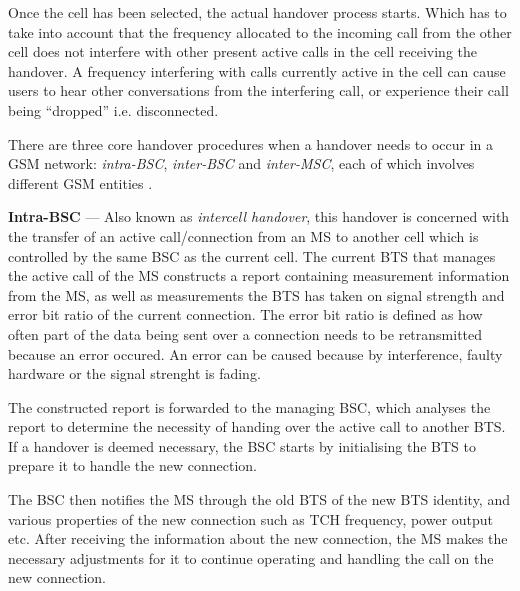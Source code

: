 Once the cell has been selected, the actual handover process starts. Which has to take into account that the frequency allocated to the incoming call from the other cell does not interfere with other present active calls in the cell receiving the handover\cite{Eisenblatter,GSMArchitectureProtocolsServices,wirelesstelcoMullet}. A frequency interfering with calls currently active in the cell can cause users to hear other conversations from the interfering call, or experience their call being ``dropped'' i.e. disconnected\cite{Eisenblatter}. 

There are three core handover procedures when a handover needs to occur in a GSM network: \emph{intra-BSC}, \emph{inter-BSC} and \emph{inter-MSC}, each of which involves different GSM entities \cite{wirelesstelcoMullet}.

\begin{description}
\item{\textbf{Intra-BSC}} --- Also known as \emph{intercell handover}, this handover is concerned with the transfer of an active call/connection from an MS to another cell which is controlled by the same BSC as the current cell\cite{wirelesstelcoMullet,GSMArchitectureProtocolsServices}. The current BTS that manages the active call of the MS constructs a report containing measurement information from the MS, as well as measurements the BTS has taken on signal strength and error bit ratio of the current connection\cite{wirelesstelcoMullet,GSMArchitectureProtocolsServices}. The error bit ratio is defined as how often part of the data being sent over a connection needs to be retransmitted because an error occured\cite{wirelesstelcoMullet,GSMArchitectureProtocolsServices}. An error can be caused because by interference, faulty hardware or the signal strenght is fading\cite{wirelesstelcoMullet,GSMArchitectureProtocolsServices}. 

The constructed report is forwarded to the managing BSC, which analyses the report to determine the necessity of handing over the active call to another BTS. If a handover is deemed necessary, the BSC starts by initialising the BTS to prepare it to handle the new connection\cite{wirelesstelcoMullet,GSMArchitectureProtocolsServices}.

The BSC then notifies the MS through the old BTS of the new BTS identity, and various properties of the new connection such as TCH frequency, power output etc. After receiving the information about the new connection, the MS makes the necessary adjustments for it to continue operating and handling the call on the new connection\cite{wirelesstelcoMullet,GSMArchitectureProtocolsServices}. 


\end{description}
